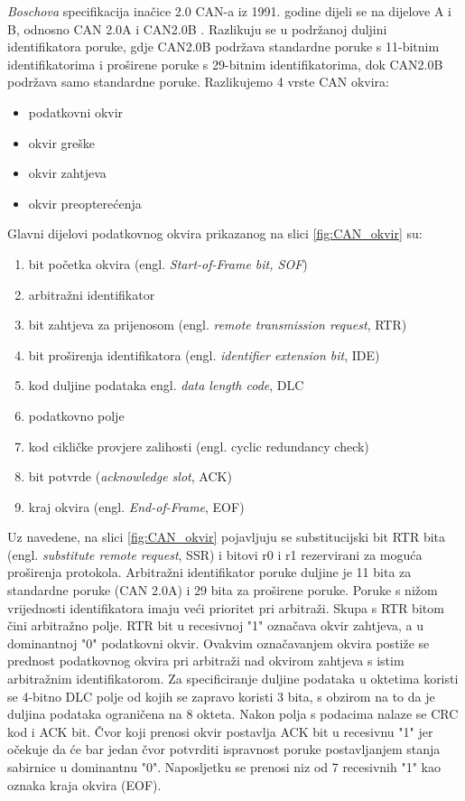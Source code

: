 \documentclass[times, utf8, diplomski, numeric]{fer}
\begin{document}
\textit{Boschova} specifikacija inačice 2.0 CAN-a iz 1991. godine dijeli se na dijelove A i B, odnosno CAN 2.0A i CAN2.0B \cite{bosch1991}. Razlikuju se u podržanoj duljini identifikatora poruke, gdje CAN2.0B podržava standardne poruke s 11-bitnim identifikatorima i proširene poruke s 29-bitnim identifikatorima, dok CAN2.0B podržava samo standardne poruke. Razlikujemo 4 vrste CAN okvira:
\begin{itemize}
    \item podatkovni okvir 
    \item okvir greške 
    \item okvir zahtjeva 
    \item okvir preopterećenja 
\end{itemize}
\newpage
Glavni dijelovi podatkovnog okvira prikazanog na slici \ref{fig:CAN_okvir} su:
\begin{enumerate}
    \item bit početka okvira (engl. \textit{Start-of-Frame bit, SOF})    
    \item arbitražni identifikator     
    \item bit zahtjeva za prijenosom (engl. \textit{remote transmission request}, RTR) 
    \item bit proširenja identifikatora (engl. \textit{identifier extension bit}, IDE) 
    \item kod duljine podataka {engl. \textit{data length code}, DLC}
    \item podatkovno polje        
    \item kod cikličke provjere zalihosti (engl. cyclic redundancy check)
    \item bit potvrde (\textit{acknowledge slot}, ACK)
    \item kraj okvira (engl. \textit{End-of-Frame}, EOF)        
\end{enumerate}

Uz navedene, na slici \ref{fig:CAN_okvir} pojavljuju se substitucijski bit RTR bita (engl. \textit{substitute remote request}, SSR) i bitovi r0 i r1 rezervirani za moguća proširenja protokola.
Arbitražni identifikator poruke duljine je 11 bita za standardne poruke (CAN 2.0A) i 29 bita za proširene poruke. Poruke s nižom vrijednosti identifikatora imaju veći prioritet pri arbitraži. Skupa s RTR bitom čini arbitražno polje. RTR bit u recesivnoj "1" označava okvir zahtjeva, a u dominantnoj "0" podatkovni okvir. Ovakvim označavanjem okvira postiže se prednost podatkovnog okvira pri arbitraži nad okvirom zahtjeva s istim arbitražnim identifikatorom. Za specificiranje duljine podataka u oktetima koristi se 4-bitno DLC polje od kojih se zapravo koristi 3 bita, s obzirom na to da je duljina podataka ograničena na 8 okteta. Nakon polja s podacima nalaze se CRC kod i ACK bit. Čvor koji prenosi okvir postavlja ACK bit u recesivnu "1" jer očekuje da će bar jedan čvor potvrditi ispravnost poruke postavljanjem stanja sabirnice u dominantnu "0". Naposljetku se prenosi niz od 7 recesivnih "1" kao oznaka kraja okvira (EOF).
\end{document}
